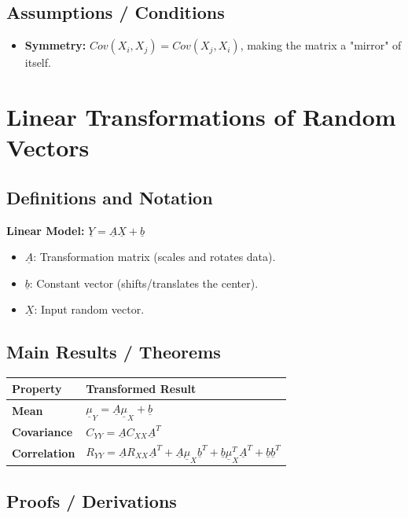 \documentclass[12pt]{article}
\begin{document}
\subsection{Assumptions / Conditions}
\begin{itemize}
    \item \textbf{Symmetry:} $Cov(X_{i},X_{j}) = Cov(X_{j},X_{i})$, making the matrix a "mirror" of itself.
\end{itemize}

\section{Linear Transformations of Random Vectors}
\subsection{Definitions and Notation}
\textbf{Linear Model:} $\underline{Y} = \underline{A}\underline{X} + \underline{b}$
\begin{itemize}
    \item $\underline{A}$: Transformation matrix (scales and rotates data).
    \item $\underline{b}$: Constant vector (shifts/translates the center).
    \item $\underline{X}$: Input random vector.
\end{itemize}

\subsection{Main Results / Theorems}
\begin{table}[h]
\centering
\begin{tabular}{ll}
\toprule
\textbf{Property} & \textbf{Transformed Result} \\ \midrule
\textbf{Mean} & $\underline{\mu}_{Y} = \underline{A}\underline{\mu}_{X} + \underline{b}$ \\
\textbf{Covariance} & $C_{YY} = \underline{A}C_{XX}\underline{A}^{T}$ \\
\textbf{Correlation} & $R_{YY} = \underline{A}R_{XX}\underline{A}^{T} + \underline{A}\underline{\mu}_{X}\underline{b}^{T} + \underline{b}\underline{\mu}_{X}^{T}\underline{A}^{T} + \underline{b}\underline{b}^{T}$ \\ \bottomrule
\end{tabular}
\end{table}

\subsection{Proofs / Derivations}
\end{document}
